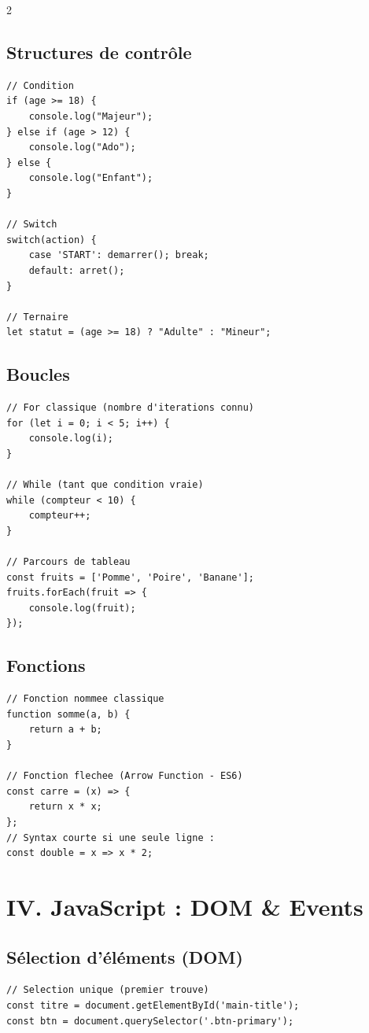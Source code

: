\documentclass[11pt,a4paper]{article}
\begin{document}
\begin{multicols*}{2}
\subsection{Structures de contrôle}
\begin{lstlisting}
// Condition
if (age >= 18) {
    console.log("Majeur");
} else if (age > 12) {
    console.log("Ado");
} else {
    console.log("Enfant");
}

// Switch
switch(action) {
    case 'START': demarrer(); break;
    default: arret();
}

// Ternaire
let statut = (age >= 18) ? "Adulte" : "Mineur";
\end{lstlisting}

\subsection{Boucles}
\begin{lstlisting}
// For classique (nombre d'iterations connu)
for (let i = 0; i < 5; i++) {
    console.log(i);
}

// While (tant que condition vraie)
while (compteur < 10) {
    compteur++;
}

// Parcours de tableau
const fruits = ['Pomme', 'Poire', 'Banane'];
fruits.forEach(fruit => {
    console.log(fruit);
});
\end{lstlisting}

\subsection{Fonctions}
\begin{lstlisting}
// Fonction nommee classique
function somme(a, b) {
    return a + b;
}

// Fonction flechee (Arrow Function - ES6)
const carre = (x) => {
    return x * x;
};
// Syntax courte si une seule ligne :
const double = x => x * 2;
\end{lstlisting}

\section{IV. JavaScript : DOM \& Events}

\subsection{Sélection d'éléments (DOM)}
\begin{lstlisting}
// Selection unique (premier trouve)
const titre = document.getElementById('main-title');
const btn = document.querySelector('.btn-primary');


\end{lstlisting}
\end{multicols*}
\end{document}

